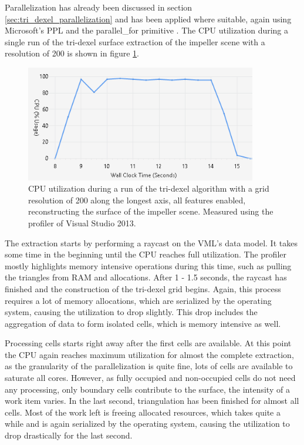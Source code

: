 Parallelization has already been discussed in section \ref{sec:tri_dexel_parallelization} and has been applied where suitable, again using Microsoft's PPL and the parallel\_for primitive \cite{ppl_parallel_for}.
The CPU utilization during a single run of the tri-dexel surface extraction of the impeller scene with a resolution of 200 is shown in figure \ref{fig:td_hq_impeller_cpu}.
%
\begin{figure}
	\centering
	\includegraphics[width=0.9\textwidth]{images/td_hq_impeller_cpu}
	\caption{
		CPU utilization during a run of the tri-dexel algorithm with a grid resolution of 200 along the longest axis, all features enabled, reconstructing the surface of the impeller scene.
		Measured using the profiler of Visual Studio 2013.
	}
	\label{fig:td_hq_impeller_cpu}
\end{figure}
%
The extraction starts by performing a raycast on the VML's data model.
It takes some time in the beginning until the CPU reaches full utilization.
The profiler mostly highlights memory intensive operations during this time, such as pulling the triangles from RAM and allocations.
After 1 - 1.5 seconds, the raycast has finished and the construction of the tri-dexel grid begins.
Again, this process requires a lot of memory allocations, which are serialized by the operating system, causing the utilization to drop slightly.
This drop includes the aggregation of data to form isolated cells, which is memory intensive as well.

Processing cells starts right away after the first cells are available.
At this point the CPU again reaches maximum utilization for almost the complete extraction, as the granularity of the parallelization is quite fine, \ie lots of cells are available to saturate all cores.
However, as fully occupied and non-occupied cells do not need any processing, only boundary cells contribute to the surface, the intensity of a work item varies.
In the last second, triangulation has been finished for almost all cells.
Most of the work left is freeing allocated resources, which takes quite a while and is again serialized by the operating system, causing the utilization to drop drastically for the last second.

